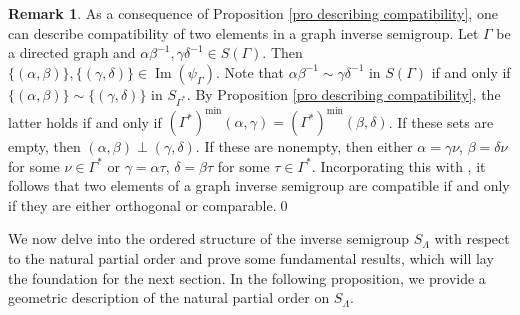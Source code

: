 \documentclass[a4paper,reqno,11pt]{amsart}
\numberwithin{equation}{section}
\theoremstyle{definition}
\newtheorem{rmk}[thm]{Remark}
\theoremstyle{remark}
\newcommand{\image}{\operatorname{Im}}
\begin{document}
\begin{rmk}\label{rem compatibility consequences}
As a consequence of Proposition \ref{pro describing compatibility}, one can describe compatibility of two elements in a graph inverse semigroup. Let $\Gamma$ be a directed graph and $\alpha\beta^{-1},\gamma\delta^{-1}\in S(\Gamma)$. Then $\{(\alpha,\beta)\},\{(\gamma,\delta)\}\in \image(\psi_\Gamma)$. Note that $\alpha\beta^{-1}\sim \gamma\delta^{-1}$ in $S(\Gamma)$ if and only if $\{(\alpha,\beta)\}\sim \{(\gamma,\delta)\}$ in $S_{\Gamma^*}$. By Proposition \ref{pro describing compatibility}, the latter holds if and only if $(\Gamma^*)^{\min}(\alpha,\gamma)=(\Gamma^*)^{\min}(\beta,\delta)$. If these sets are empty, then $(\alpha,\beta)\perp (\gamma,\delta)$. If these are nonempty, then either $\alpha=\gamma\nu$, $\beta=\delta\nu$ for some $\nu\in \Gamma^*$ or $\gamma=\alpha\tau$, $\delta=\beta\tau$ for some $\tau\in \Gamma^*$. Incorporating this with \cite[Lemma 15(2)]{Mesyan}, it follows that two elements of a graph inverse semigroup are compatible if and only if they are either orthogonal or comparable.\qed     
\end{rmk}

We now delve into the ordered structure of the inverse semigroup $S_\Lambda$ with respect to the natural partial order and prove some fundamental results, which will lay the foundation for the next section. In the following proposition, we provide a geometric description of the natural partial order on $S_\Lambda$. 
\end{document}
